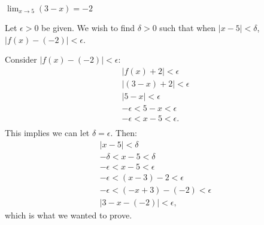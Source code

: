 {$\displaystyle \lim_{x\to 5} (3-x) = -2$}
{Let $\epsilon >0$ be given. We wish to find $\delta >0$ such that when $|x-5|<\delta$, $|f(x)-(-2)|<\epsilon$. 

Consider $|f(x)-(-2)|<\epsilon$:
\begin{gather*}
|f(x) + 2 | < \epsilon \\
|(3-x) + 2 |<\epsilon \\
| 5-x | < \epsilon \\
-\epsilon < 5-x < \epsilon \\
-\epsilon < x-5 < \epsilon. \\
\end{gather*}
This implies we can let $\delta =\epsilon$. Then:
\begin{gather*}
|x-5|<\delta \\
-\delta < x-5 < \delta\\
-\epsilon < x-5 < \epsilon\\
-\epsilon < (x-3)-2 < \epsilon \\
-\epsilon < (-x+3)-(-2) < \epsilon \\
|3-x - (-2)| < \epsilon,
\end{gather*}
which is what we wanted to prove.
}

